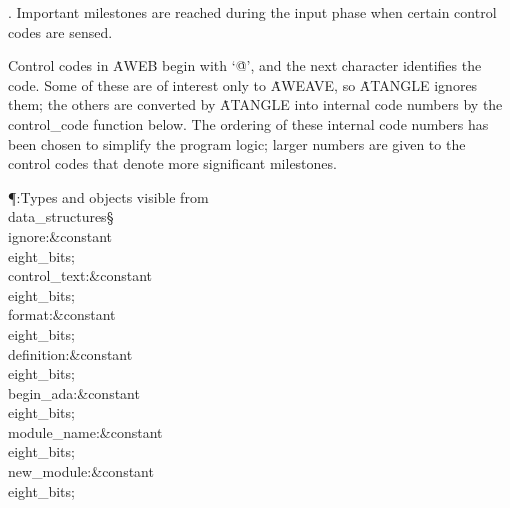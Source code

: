 . Important milestones are reached during the input phase when certain
control codes are sensed.

Control codes in \.{AWEB} begin with `\.{@}', and the next character
identifies the code. Some of these are of interest only to \.{AWEAVE},
so \.{ATANGLE} ignores them; the others are converted by \.{ATANGLE} into
internal code numbers by the \\{control\_code} function below. The ordering
of these internal code numbers has been chosen to simplify the program logic;
larger numbers are given to the control codes that denote more significant
milestones.

\Y\P\?\4:Types and objects visible from \\{data\_structures}\X\mathrel{+}\S%
\?\6
\\{ignore}\?:\?\&{constant}\8\\{eight\_bits}\?\K{};\6
\\{control\_text}\?:\?\&{constant}\8\\{eight\_bits}\?\K{}\?;\6
\\{format}\?:\?\&{constant}\8\\{eight\_bits}\?\K{}\?;\6
\\{definition}\?:\?\&{constant}\8\\{eight\_bits}\?\K{}\?;\6
\\{begin\_ada}\?:\?\&{constant}\8\\{eight\_bits}\?\K{}\?;\6
\\{module\_name}\?:\?\&{constant}\8\\{eight\_bits}\?\K{}\?;\6
\\{new\_module}\?:\?\&{constant}\8\\{eight\_bits}\?\K{}\?;\par
\fi

